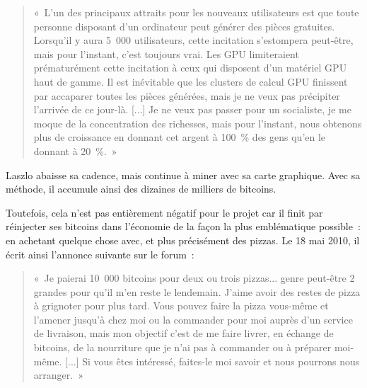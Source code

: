 \begin{quote}
«~L'un des principaux attraits pour les nouveaux utilisateurs est que toute personne disposant d'un ordinateur peut générer des pièces gratuites. Lorsqu'il y aura 5~000 utilisateurs, cette incitation s'estompera peut-être, mais pour l'instant, c'est toujours vrai. Les GPU limiteraient prématurément cette incitation à ceux qui disposent d'un matériel GPU haut de gamme. Il est inévitable que les clusters de calcul GPU finissent par accaparer toutes les pièces générées, mais je ne veux pas précipiter l'arrivée de ce jour-là. [...] Je ne veux pas passer pour un socialiste, je me moque de la concentration des richesses, mais pour l'instant, nous obtenons plus de croissance en donnant cet argent à 100~\% des gens qu'en le donnant à 20~\%.~»
\end{quote}

Laszlo abaisse sa cadence, mais continue à miner avec sa carte graphique. Avec sa méthode, il accumule ainsi des dizaines de milliers de bitcoins.

Toutefois, cela n'est pas entièrement négatif pour le projet car il finit par réinjecter ses bitcoins dans l'économie de la façon la plus emblématique possible~: en achetant quelque chose avec, et plus précisément des pizzas. Le 18 mai 2010, il écrit ainsi l'annonce suivante sur le forum~:


\begin{quote}
«~Je paierai 10~000 bitcoins pour deux ou trois pizzas... genre peut-être 2 grandes pour qu'il m'en reste le lendemain. J'aime avoir des restes de pizza à grignoter pour plus tard. Vous pouvez faire la pizza vous-même et l'amener jusqu'à chez moi ou la commander pour moi auprès d'un service de livraison, mais mon objectif c'est de me faire livrer, en échange de bitcoins, de la nourriture que je n'ai pas à commander ou à préparer moi-même. [...] Si vous êtes intéressé, faites-le moi savoir et nous pourrons nous arranger.~»
\end{quote}


